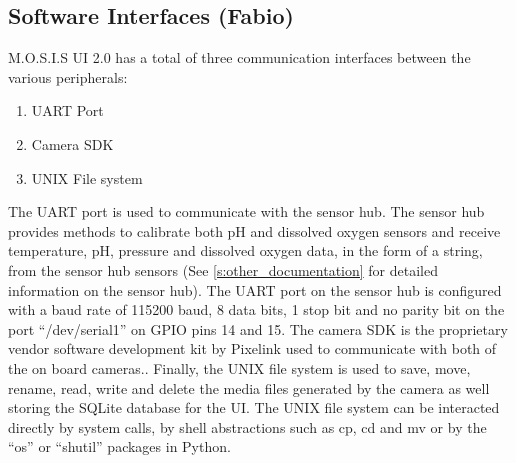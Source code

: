 \subsection{Software Interfaces (Fabio)}
M.O.S.I.S UI 2.0 has a total of three communication interfaces between the various peripherals:
\begin{enumerate}
\item UART Port
\item Camera SDK
\item UNIX File system
\end{enumerate}
The UART port is used to communicate with the sensor hub. The sensor hub provides methods to calibrate both pH and dissolved oxygen sensors and receive temperature, pH, pressure and dissolved oxygen data, in the form of a string, from the sensor hub sensors (See \ref{s:other_documentation} for detailed information on the sensor hub). The UART port on the sensor hub is configured with a baud rate of 115200 baud, 8 data bits, 1 stop bit and no parity bit on the port ``/dev/serial1'' on GPIO pins 14 and 15.\cite{UARTRaspberryPi} The camera SDK is the proprietary vendor software development kit by Pixelink used to communicate with both of the on board cameras.\cite{WhatFunctionsFeatures}. Finally, the UNIX file system is used to save, move, rename, read, write and delete the media files generated by the camera as well storing the SQLite database for the UI. The UNIX file system can be interacted directly by system calls, by shell abstractions such as cp, cd and mv or by the ``os'' or ``shutil'' packages in Python.\cite{SystemCallsUnix}\cite{UnixShellSummary}\cite{OsMiscellaneousOperating}\cite{ShutilHighlevelFile}
